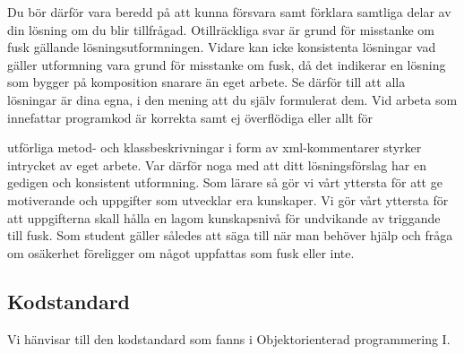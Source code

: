 \documentclass{article}
\begin{document}
 Du bör därför vara beredd på att kunna försvara samt förklara samtliga delar av din
 lösning om du blir tillfrågad. Otillräckliga svar är grund för misstanke om fusk gällande
 lösningsutformningen. Vidare kan icke konsistenta lösningar vad gäller utformning vara grund
 för misstanke om fusk, då det indikerar en lösning som bygger på komposition snarare än
 eget arbete. Se därför till att alla lösningar är dina egna, i den mening att du själv formulerat
 dem. Vid arbeta som innefattar programkod är korrekta samt ej överflödiga eller allt för 

utförliga metod- och klassbeskrivningar i form av xml-kommentarer styrker intrycket av eget
arbete. Var därför noga med att ditt lösningsförslag har en gedigen och konsistent utformning.
Som lärare så gör vi vårt yttersta för att ge motiverande och uppgifter som utvecklar era
kunskaper. Vi gör vårt yttersta för att uppgifterna skall hålla en lagom kunskapsnivå för
undvikande av triggande till fusk. Som student gäller således att säga till när man behöver
hjälp och fråga om osäkerhet föreligger om något uppfattas som fusk eller inte.

\subsection*{Kodstandard}
Vi hänvisar till den kodstandard som fanns i Objektorienterad programmering I.
\end{document}
